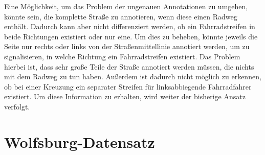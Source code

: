 Eine Möglichkeit, um das Problem der ungenauen Annotationen zu umgehen, könnte sein, die komplette Straße zu annotieren, 
wenn diese einen Radweg enthält. Dadurch kann aber nicht differenziert werden, ob ein Fahrradstreifen in beide 
Richtungen existiert oder nur eine. Um dies zu beheben, könnte jeweils die Seite nur rechts oder links von der Straßenmittellinie
annotiert werden, um zu signalisieren, in welche Richtung ein Fahrradstreifen existiert. 
Das Problem hierbei ist, dass sehr große Teile der Straße annotiert werden müssen, die nichts mit dem Radweg zu tun haben.
Außerdem ist dadurch nicht möglich zu erkennen, ob bei einer Kreuzung ein separater Streifen für linksabbiegende 
Fahrradfahrer existiert. Um diese Information zu erhalten, wird weiter der bisherige Ansatz verfolgt.  
   

\section{Wolfsburg-Datensatz} \label{sec:wolfsburg}

